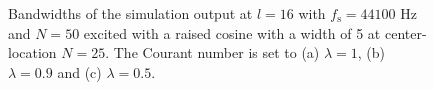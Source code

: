 \begin{figure}[t]
    \caption{Bandwidths of the simulation output at $l = 16$ 
    with $f_\text{s} = 44100$ Hz and $N = 50$ excited with a raised cosine with a width of 5 at center-location $N = 25$. The Courant number is set to (a) $\lambda = 1$, (b) $\lambda = 0.9$ and (c) $\lambda = 0.5$.\label{fig:1DWaveBandwidth}}
\end{figure}